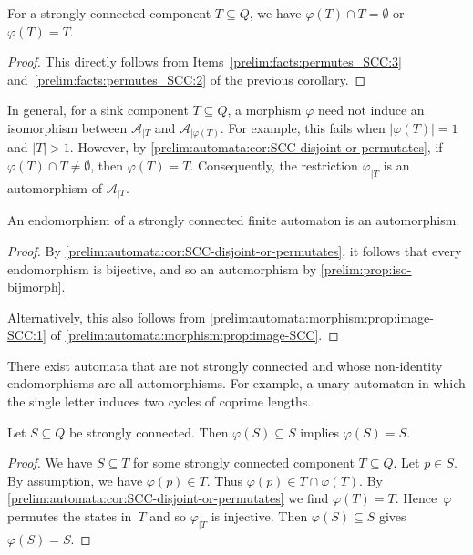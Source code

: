 \begin{corollary} \label{prelim:automata:cor:SCC-disjoint-or-permutates}
	For a strongly connected component $T \subseteq Q$,
	we have $\varphi(T) \cap T = \emptyset$
	or $\varphi(T) = T$.
\end{corollary}
\begin{proof}
	This directly follows from Items~\ref{prelim:facts:permutes_SCC:3} and~\ref{prelim:facts:permutes_SCC:2}
	of the previous corollary.	
\end{proof}

\begin{remark}	
	In general, for a sink component $T \subseteq Q$, a morphism $\varphi$ need not induce an isomorphism between
	$\mathcal A_{|T}$ and $\mathcal A_{|\varphi(T)}$.
	For example, this fails when $|\varphi(T)| = 1$ and $|T| > 1$.
	However, by \cref{prelim:automata:cor:SCC-disjoint-or-permutates}, if
	$\varphi(T) \cap T \neq \emptyset$, then $\varphi(T)=T$.
	Consequently, the restriction $\varphi_{|T}$ is an automorphism of
	$\mathcal A_{|T}$.
\end{remark}

\begin{corollary} \label{prelim:automata:morphism:prop:endo-SCC-is-iso}
	An endomorphism of a strongly connected finite automaton is an automorphism.
\end{corollary}
\begin{proof}
	By \cref{prelim:automata:cor:SCC-disjoint-or-permutates},
	it follows that every endomorphism is bijective, and so an automorphism by \cref{prelim:prop:iso-bijmorph}.  
	
	Alternatively, this also follows from \cref{prelim:automata:morphism:prop:image-SCC:1} 
	of \cref{prelim:automata:morphism:prop:image-SCC}.
\end{proof}

There exist automata that are not strongly connected and whose non-identity endomorphisms are all automorphisms. For example, a unary automaton in which the single letter induces two cycles of coprime lengths.

\begin{corollary} \label{prelim:automata:morphim:cor:strongly-conn}
	Let $S \subseteq Q$ be strongly connected.
	Then $\varphi(S) \subseteq S$
	implies $\varphi(S) = S$.
\end{corollary}
\begin{proof}
	We have $S \subseteq T$ for some strongly connected component $T \subseteq Q$.
	Let $p \in S$. By assumption, we have $\varphi(p) \in T$.
	Thus $\varphi(p) \in T \cap \varphi(T)$.
	By \cref{prelim:automata:cor:SCC-disjoint-or-permutates}
	we find $\varphi(T) = T$.
	Hence~$\varphi$ permutes the states in~$T$
	and so $\varphi_{|T}$ is injective.
	Then $\varphi(S) \subseteq S$ gives $\varphi(S) = S$.
\end{proof}


